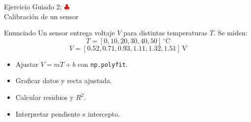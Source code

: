 \documentclass[10pt]{beamer}
\begin{document}
\begin{frame}{Ejercicio Guiado 2: \hfill \textcolor{red}{$\clubsuit$} \\ Calibración de un sensor}
  \begin{block}{Enunciado}
    Un sensor entrega voltaje \(V\) para distintas temperaturas \(T\). Se miden:
    \[
      T = [0, 10, 20, 30, 40, 50]\,^\circ\mathrm{C}
    \]
    \[
      V = [0.52, 0.71, 0.93, 1.11, 1.32, 1.51]\,\mathrm{V}
    \]
    \begin{itemize}
      \item Ajustar \(V = mT + b\) con \texttt{np.polyfit}.
      \item Graficar datos y recta ajustada.
      \item Calcular residuos y \(R^2\).
      \item Interpretar pendiente e intercepto.
    \end{itemize}
  \end{block}
\end{frame}
\end{document}
